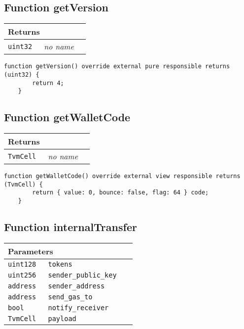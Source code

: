 \subsection{Function getVersion}


\ifsoltables
\noindent\begin{tabular}{|l|l|p{5cm}|}\hline
\multicolumn{3}{|l|}{\bf Returns}\\\hline
\tt uint32 & {\em no name} &\\\hline
\end{tabular}
\fi

\vspace{2cm}

\begin{lstlisting}[firstnumber=54]
    function getVersion() override external pure responsible returns (uint32) {
        return 4;
    }
\end{lstlisting}

\subsection{Function getWalletCode}


\ifsoltables
\noindent\begin{tabular}{|l|l|p{5cm}|}\hline
\multicolumn{3}{|l|}{\bf Returns}\\\hline
\tt TvmCell & {\em no name} &\\\hline
\end{tabular}
\fi

\vspace{2cm}

\begin{lstlisting}[firstnumber=87]
    function getWalletCode() override external view responsible returns (TvmCell) {
        return { value: 0, bounce: false, flag: 64 } code;
    }
\end{lstlisting}

\subsection{Function internalTransfer}


\ifsoltables
\noindent\begin{tabular}{|l|l|p{5cm}|}\hline
\multicolumn{3}{|l|}{\bf Parameters}\\\hline
\tt uint128 & \tt tokens &\\\hline
\tt uint256 & \tt sender\_{}public\_{}key &\\\hline
\tt address & \tt sender\_{}address &\\\hline
\tt address & \tt send\_{}gas\_{}to &\\\hline
\tt bool & \tt notify\_{}receiver &\\\hline
\tt TvmCell & \tt payload &\\\hline
\end{tabular}
\fi

